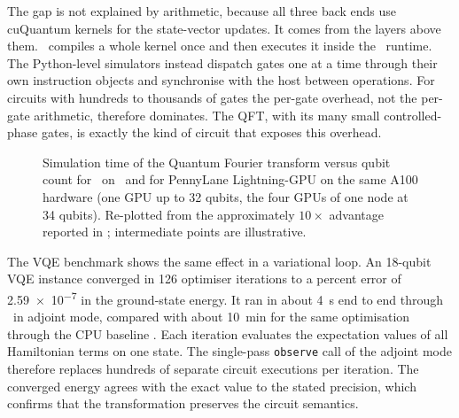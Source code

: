 The gap is not explained by arithmetic, because all three back ends use cuQuantum kernels for the state-vector updates. It comes from the layers above them. \qgear\ compiles a whole kernel once and then executes it inside the \cudaq\ runtime. The Python-level simulators instead dispatch gates one at a time through their own instruction objects and synchronise with the host between operations. For circuits with hundreds to thousands of gates the per-gate overhead, not the per-gate arithmetic, therefore dominates. The QFT, with its many small controlled-phase gates, is exactly the kind of circuit that exposes this overhead.

\begin{figure}[htbp]
\centering
{}
\caption{Simulation time of the Quantum Fourier transform versus qubit count for \qgear\ on \cudaq\ and for PennyLane Lightning-GPU on the same A100 hardware (one GPU up to 32 qubits, the four GPUs of one node at 34 qubits). Re-plotted from the approximately $10\times$ advantage reported in \cite{guo2025qgear}; intermediate points are illustrative.}
\label{fig:qgear:qft}
\end{figure}

The VQE benchmark shows the same effect in a variational loop. An 18-qubit VQE instance converged in 126 optimiser iterations to a percent error of \num{2.59e-7} in the ground-state energy. It ran in about \SI{4}{\second} end to end through \qgear\ in adjoint mode, compared with about \SI{10}{\minute} for the same optimisation through the CPU baseline \cite{guo2025qgear}. Each iteration evaluates the expectation values of all Hamiltonian terms on one state. The single-pass \texttt{observe} call of the adjoint mode therefore replaces hundreds of separate circuit executions per iteration. The converged energy agrees with the exact value to the stated precision, which confirms that the transformation preserves the circuit semantics.

